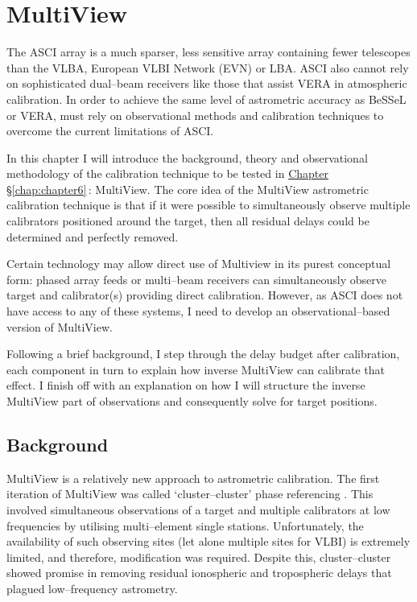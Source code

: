 \chapter{MultiView}\label{chap:chapter5}
	\onehalfspacing	

	\vspace{2cm}
	The ASCI array is a much sparser, less sensitive array containing fewer telescopes than the VLBA, European VLBI Network (EVN) or LBA. ASCI also cannot rely on sophisticated dual--beam receivers like those that assist VERA in atmospheric calibration. In order to achieve the same level of astrometric accuracy as BeSSeL or VERA, \spirals\space must rely on observational methods and calibration techniques to overcome the current limitations of ASCI. %
	
	In this chapter I will introduce the background, theory and observational methodology of the calibration technique to be tested in \hyperref[chap:chapter6]{Chapter \S\ref*{chap:chapter6}}\,: MultiView.  The core idea of the MultiView astrometric calibration technique is that if it were possible to simultaneously observe multiple calibrators positioned around the target, then all residual delays could be determined and perfectly removed.
	
	Certain technology may allow direct use of Multiview in its purest conceptual form: phased array feeds or multi--beam receivers can simultaneously observe target and calibrator(s) providing direct calibration. However, as ASCI does not have access to any of these systems, I need to develop an observational--based version of MultiView.
	
	Following a brief background, I step through the delay budget after calibration, each component in turn to explain how inverse MultiView can calibrate that effect. I finish off with an explanation on how I will structure the inverse MultiView part of observations and consequently solve for target positions. 

	
	\singlespacing

\newpage
\section{Background}
	MultiView is a relatively new approach to astrometric calibration. The first iteration of MultiView was called `cluster--cluster' phase referencing \citep{Rioja1997,Rioja2002}. This involved simultaneous observations of a target and multiple calibrators at low frequencies by utilising multi--element single stations. Unfortunately, the availability of such observing sites (let alone multiple sites for VLBI) is extremely limited, and therefore, modification was required. Despite this, cluster--cluster showed promise in removing residual ionospheric and tropospheric delays that plagued low--frequency astrometry.
	
